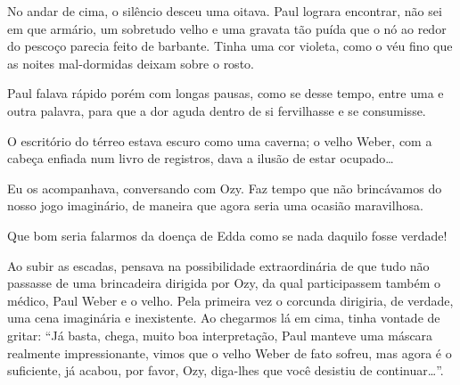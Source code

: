 
No andar de cima, o silêncio desceu uma oitava. Paul lograra encontrar, não sei em que armário, um sobretudo velho e uma gravata tão puída que o nó ao redor do pescoço parecia feito de barbante. Tinha uma cor violeta, como o véu fino que as noites mal-dormidas deixam sobre o rosto.


Paul falava rápido porém com longas pausas, como se desse tempo, entre uma e outra palavra, para que a dor aguda dentro de si fervilhasse e se consumisse.

O escritório do térreo estava escuro como uma caverna; o velho Weber, com a cabeça enfiada num livro de registros, dava a ilusão de estar ocupado\dots


Eu os acompanhava, conversando com Ozy. Faz tempo que não brincávamos do nosso jogo imaginário, de maneira que agora seria uma ocasião maravilhosa.

Que bom seria falarmos da doença de Edda como se nada daquilo fosse verdade!

Ao subir as escadas, pensava na possibilidade extraordinária de que tudo não passasse de uma brincadeira dirigida por Ozy, da qual participassem também o médico, Paul Weber e o velho. Pela primeira vez o corcunda dirigiria, de verdade, uma cena imaginária e inexistente. Ao chegarmos lá em cima, tinha vontade de gritar: ``Já basta, chega, muito boa interpretação, Paul manteve uma máscara realmente impressionante, vimos que o velho Weber de fato sofreu, mas agora é o suficiente, já acabou, por favor, Ozy, diga-lhes que você desistiu de continuar\dots''.

